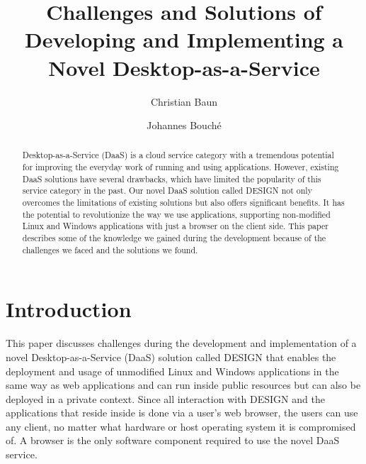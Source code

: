 \documentclass[runningheads]{llncs}
\begin{document}
%
\title{Challenges and Solutions of Developing and
	Implementing a Novel Desktop-as-a-Service}
%
%
\author{Christian Baun \and 
Johannes Bouché}
%
%
%
\maketitle              %
%
\begin{abstract}
Desktop-as-a-Service (DaaS) is a cloud service category with a tremendous potential for improving the everyday work of running and using applications. However, existing DaaS solutions have several drawbacks, which have limited the popularity of this service category in the past. Our novel DaaS solution called DESIGN not only overcomes the limitations of existing solutions but also offers significant benefits. It has the potential to revolutionize the way we use applications, supporting non-modified Linux and Windows applications with just a browser on the client side. This paper describes some of the knowledge we gained during the development because of the challenges we faced and the solutions we found. 

\end{abstract}
%
%
%
\section{Introduction}


This paper discusses challenges during the development and implementation of a novel Desktop-as-a-Service (DaaS) solution called DESIGN that enables the deployment and usage of unmodified Linux and Windows applications in the same way as web applications and can run inside public resources but can also be deployed in a private context. Since all interaction with DESIGN and the applications that reside inside is done via a user's web browser, the users can use any client, no matter what hardware or host operating system it is compromised of. A browser is the only software component required to use the novel DaaS service.
\end{document}
